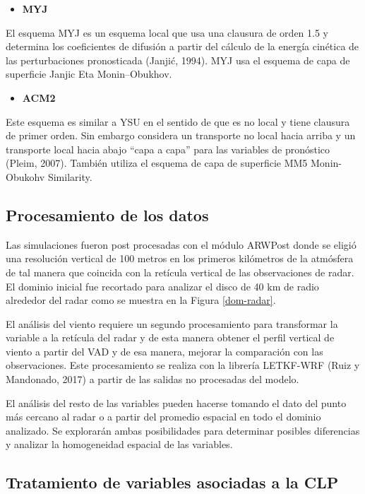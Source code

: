 \documentclass[12pt,spanish,oneside, a4paper]{book}
\providecommand{\tightlist}{%
  \setlength{\itemsep}{0pt}\setlength{\parskip}{0pt}}
\begin{document}
\begin{itemize}
\tightlist
\item
  \textbf{MYJ}
\end{itemize}

El esquema MYJ es un esquema local que usa una clausura de orden 1.5 y
determina los coeficientes de difusión a partir del cálculo de la
energía cinética de las perturbaciones pronosticada (Janjić, 1994). MYJ
usa el esquema de capa de superficie Janjic Eta Monin--Obukhov.

\begin{itemize}
\tightlist
\item
  \textbf{ACM2}
\end{itemize}

Este esquema es similar a YSU en el sentido de que es no local y tiene
clausura de primer orden. Sin embargo considera un transporte no local
hacia arriba y un transporte local hacia abajo ``capa a capa'' para las
variables de pronóstico (Pleim, 2007). También utiliza el esquema de
capa de superficie MM5 Monin-Obukohv Similarity.

\subsection{Procesamiento de los
datos}\label{procesamiento-de-los-datos}

Las simulaciones fueron post procesadas con el módulo ARWPost donde se
eligió una resolución vertical de 100 metros en los primeros kilómetros
de la atmósfera de tal manera que coincida con la retícula vertical de
las observaciones de radar. El dominio inicial fue recortado para
analizar el disco de 40 km de radio alrededor del radar como se muestra
en la Figura \ref{dom-radar}.

El análisis del viento requiere un segundo procesamiento para
transformar la variable a la retícula del radar y de esta manera obtener
el perfil vertical de viento a partir del VAD y de esa manera, mejorar
la comparación con las observaciones. Este procesamiento se realiza con
la librería LETKF-WRF (Ruiz y Mandonado, 2017) a partir de las salidas
no procesadas del modelo.

El análisis del resto de las variables pueden hacerse tomando el dato
del punto más cercano al radar o a partir del promedio espacial en todo
el dominio analizado. Se explorarán ambas posibilidades para determinar
posibles diferencias y analizar la homogeneidad espacial de las
variables.

\subsection{Tratamiento de variables asociadas a la
CLP}\label{tratamiento-de-variables-asociadas-a-la-clp}
\end{document}
